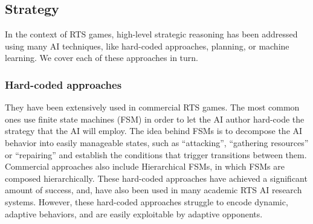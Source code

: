 \documentclass{llncs}
\begin{document}



\subsection{Strategy}

In the context of RTS  games, high-level strategic reasoning has been addressed using many
AI techniques, like  hard-coded approaches, planning,
or  machine   learning.  We  cover   each  of  these
approaches in turn.

\subsubsection{Hard-coded  approaches}
They have  been extensively  used in commercial  RTS games.   The most
common      ones     use      finite     state      machines     (FSM)
\cite{FSM_AIGameProgWisdom2003}  in   order  to  let  the   AI  author
hard-code the strategy  that the AI will employ. The  idea behind FSMs
is to decompose the AI behavior into easily manageable states, such as
``attacking'', ``gathering resources''  or ``repairing'' and establish
the  conditions that  trigger  transitions  between them.   Commercial
approaches also include Hierarchical FSMs,  in which FSMs are composed
hierarchically.    These  hard-coded   approaches   have  achieved   a
significant  amount of  success,  and, have  also been  used in  many academic  RTS AI
research systems.   However, these  hard-coded approaches  struggle to
encode  dynamic, adaptive  behaviors,  and are  easily exploitable  by
adaptive opponents.
\end{document}
